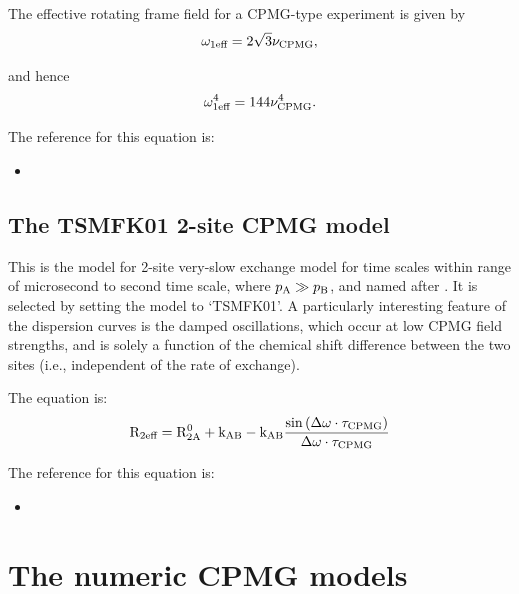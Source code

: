 The effective rotating frame field for a CPMG-type experiment is given by
\begin{equation}
    \omega_\textrm{1eff} = 2\sqrt{3}\nu_\textrm{CPMG} ,
\end{equation}

and hence
\begin{equation}
    \omega_\textrm{1eff}^4 = 144\nu_\textrm{CPMG}^4 .
\end{equation}

The reference for this equation is:
\begin{itemize}
\item {}
\end{itemize}




\subsection{The TSMFK01 2-site CPMG model}
\label{sect: dispersion: TSMFK01 model}



This is the model for 2-site very-slow exchange model for time scales within range of microsecond to second time scale, where $p_\textrm{A} \gg p_\textrm{B}$, and named after \citet{Tollinger01}.  It is selected by setting the model to `TSMFK01'.  A particularly interesting feature of the dispersion curves is the damped oscillations, which occur at low CPMG field strengths, and is solely a function of the chemical shift difference between the two sites (i.e., independent of the rate of exchange).  

The equation is:
\begin{align}
    \mathrm{R}_\textrm{2eff} = \mathrm{R}_\mathrm{2A}^0 + \textrm{k}_\textrm{AB} - \textrm{k}_\textrm{AB} \frac{\sin{(\Delta\omega\cdot \tau_\textrm{CPMG})}}{\Delta\omega \cdot \tau_\textrm{CPMG}}
\end{align}

The reference for this equation is:
\begin{itemize}
\item {}
\end{itemize}




\section{The numeric CPMG models}
\label{sect: dispersion: numeric CPMG models}


